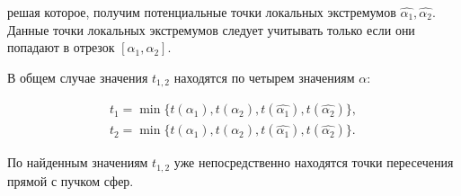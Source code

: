 \documentclass[a4paper,10pt]{extarticle}                     %
\numberwithin{equation}{section}                             %
\numberwithin{figure}{section}                               %
\theoremstyle{plain}                                         %
\begin{document}
решая которое, получим потенциальные точки локальных экстремумов $\hat{\alpha_1}, \hat{\alpha_2}$.
Данные точки локальных экстремумов следует учитывать только если они попадают в отрезок $[\alpha_1, \alpha_2]$.

В общем случае значения $t_{1,2}$ находятся по четырем значениям $\alpha$:

\begin{align}
    t_1 = \min\{t(\alpha_1), t(\alpha_2), t(\hat{\alpha_1}), t(\hat{\alpha_2})\}, \\
    t_2 = \min\{t(\alpha_1), t(\alpha_2), t(\hat{\alpha_1}), t(\hat{\alpha_2})\}.
\end{align}

По найденным значениям $t_{1, 2}$ уже непосредственно находятся точки пересечения прямой с пучком сфер.
\end{document}
